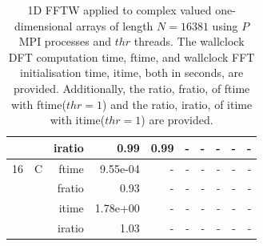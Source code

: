 \documentclass[a4paper]{article}
\begin{document}
\begin{table}[htbp]
\begin{center}
\begin{small}
\begin{tabular}{|r|r|r|r|r|r|r|r|r|r|}
          &      & iratio & 0.99 & 0.99 &     -     &     -     &     -     &     -     &     -     \\ \hline 
     16 & C & ftime & 9.55e-04 &     -     &     -     &     -     &     -     &     -     &     -     \\   
          &      & fratio & 0.93 &     -     &     -     &     -     &     -     &     -     &     -     \\   
          &      & itime & 1.78e+00 &     -     &     -     &     -     &     -     &     -     &     -     \\   
          &      & iratio & 1.03 &     -     &     -     &     -     &     -     &     -     &     -     \\ \hline 
   \end{tabular}
\caption{1D FFTW applied to complex valued one-dimensional arrays of length $N=16381$ using $P$ MPI processes and $thr$ threads. The wallclock DFT computation time, ftime, and wallclock FFT initialisation time, itime, both in seconds, are provided. Additionally, the ratio, fratio, of ftime  with ftime($thr=1$) and the ratio, iratio, of itime  with itime($thr=1$) are provided. }\label{TblFFT1d16381}
\end{small}
\end{center}
\end{table}
\end{document}
